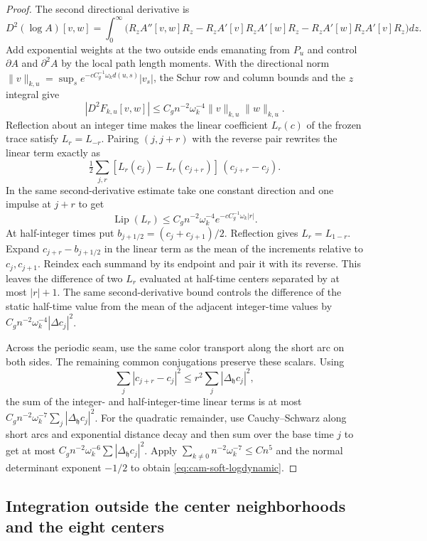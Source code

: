 \documentclass[11pt,a4paper]{article}
\numberwithin{equation}{section}
\newcommand{\hper}{\mathfrak h}
\begin{document}
\begin{proof}
The second directional derivative is
\[
 D^2(\log A)[v,w]=\int_0^\infty\bigl(
 R_z A''[v,w]R_z
 -R_z A'[v]R_z A'[w]R_z
 -R_z A'[w]R_z A'[v]R_z\bigr)dz .
\]
Add exponential weights at the two outside ends emanating from \(P_u\) and control \(\partial A\) and \(\partial^2A\) by the local path length moments. With the directional norm \(\|v\|_{k,u}=\sup_s e^{-c C_g^{-1}\omega_k d(u,s)}|v_s|\), the Schur row and column bounds and the \(z\) integral give
\[
 |D^2F_{k,u}[v,w]|\le C_g n^{-2}\omega_k^{-4}
                                   \|v\|_{k,u}\|w\|_{k,u}.
\]
Reflection about an integer time makes the linear coefficient \(L_r(c)\) of the frozen trace satisfy \(L_r=L_{-r}\). Pairing \((j,j+r)\) with the reverse pair rewrites the linear term exactly as
\[
 \tfrac12\sum_{j,r}[L_r(c_j)-L_r(c_{j+r})]\,(c_{j+r}-c_j).
\]
In the same second-derivative estimate take one constant direction and one impulse at \(j+r\) to get
\[
 \operatorname{Lip}(L_r)\le C_gn^{-2}\omega_k^{-4}e^{-cC_g^{-1}\omega_k|r|}.
\]
At half-integer times put \(b_{j+1/2}=(c_j+c_{j+1})/2\). Reflection gives \(L_r=L_{1-r}\). Expand \(c_{j+r}-b_{j+1/2}\) in the linear term as the mean of the increments relative to \(c_j,c_{j+1}\). Reindex each summand by its endpoint and pair it with its reverse. This leaves the difference of two \(L_r\) evaluated at half-time centers separated by at most \(|r|+1\). The same second-derivative bound controls the difference of the static half-time value from the mean of the adjacent integer-time values by \(C_gn^{-2}\omega_k^{-4}|\Delta c_j|^2\).

Across the periodic seam, use the same color transport along the short arc on both sides. The remaining common conjugations preserve these scalars. Using
\[
 \sum_j|c_{j+r}-c_j|^2\le r^2\sum_j|\Delta_\hper  c_j|^2,
\]
the sum of the integer- and half-integer-time linear terms is at most \(C_gn^{-2}\omega_k^{-7}\sum_j|\Delta_\hper  c_j|^2\).
For the quadratic remainder, use Cauchy--Schwarz along short arcs and exponential distance decay and then sum over the base time \(j\) to get at most \(C_gn^{-2}\omega_k^{-6}\sum|\Delta_\hper  c_j|^2\). Apply \(\sum_{k\ne0}n^{-2}\omega_k^{-7}\le Cn^5\) and the normal determinant exponent \(-1/2\) to obtain \eqref{eq:cam-soft-logdynamic}.
\end{proof}

\subsection{Integration outside the center neighborhoods and the eight centers}
\end{document}
